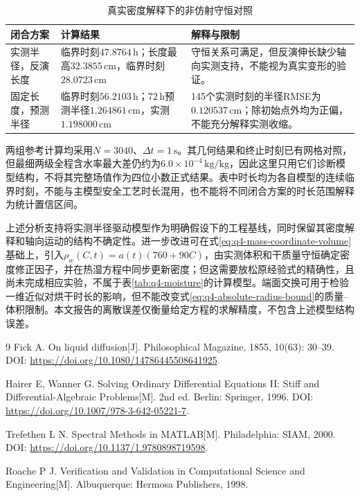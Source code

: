 \documentclass[withoutpreface,bwprint]{cumcmthesis}
\begin{document}
\begin{table}[H]
\centering
\small
\renewcommand{\arraystretch}{1.2}
\caption{真实密度解释下的非仿射守恒对照}
\label{tab:q4-closure-comparison}
\begin{tabularx}{\textwidth}{>{\raggedright\arraybackslash}p{} >{\raggedright\arraybackslash}X >{\raggedright\arraybackslash}X}
\hline
闭合方案 & 计算结果 & 解释与限制\\
\hline
实测半径，反演长度 & 临界时刻$47.8764\,\mathrm h$；长度最高$32.3855\,\mathrm{cm}$，临界时刻$28.0723\,\mathrm{cm}$ & 守恒关系可满足，但反演伸长缺少轴向实测支持，不能视为真实变形的验证。\\
固定长度，预测半径 & 临界时刻$56.2103\,\mathrm h$；$72\,\mathrm h$预测半径$1.264861\,\mathrm{cm}$，实测$1.198000\,\mathrm{cm}$ & 145个实测时刻的半径RMSE为$0.120537\,\mathrm{cm}$；除初始点外均为正偏，不能充分解释实测收缩。\\
\hline
\end{tabularx}
\end{table}

两组参考计算均采用$N=3040$、$\Delta t=1\,\mathrm s$。其几何结果和终止时刻已有网格对照，但最细两级全程含水率最大差仍约为$6.0\times10^{-4}\,\mathrm{kg/kg}$，因此这里只用它们诊断模型结构，不将其完整场值作为四位小数正式结果。表中时长均为各自模型的连续临界时刻，不能与主模型安全工艺时长混用，也不能将不同闭合方案的时长范围解释为统计置信区间。

上述分析支持将实测半径驱动模型作为明确假设下的工程基线，同时保留其密度解释和轴向运动的结构不确定性。进一步改进可在式\eqref{eq:q4-mass-coordinate-volume}基础上，引入$\rho_w(C,t)=a(t)(760+90C)$，由实测体积和干质量守恒确定密度修正因子，并在热湿方程中同步更新密度；但这需要放松原经验式的精确性，且尚未完成相应实验，不属于表\ref{tab:q4-moisture}的计算模型。端面交换可用于检验一维近似对烘干时长的影响，但不能改变式\eqref{eq:q4-absolute-radius-bound}的质量--体积限制。本文报告的离散误差仅衡量给定方程的求解精度，不包含上述模型结构误差。

\begin{thebibliography}{9}
Fick A. On liquid diffusion[J]. Philosophical Magazine, 1855, 10(63): 30--39. DOI: \url{https://doi.org/10.1080/14786445508641925}.

Hairer E, Wanner G. Solving Ordinary Differential Equations II: Stiff and Differential-Algebraic Problems[M]. 2nd ed. Berlin: Springer, 1996. DOI: \url{https://doi.org/10.1007/978-3-642-05221-7}.

Trefethen L N. Spectral Methods in MATLAB[M]. Philadelphia: SIAM, 2000. DOI: \url{https://doi.org/10.1137/1.9780898719598}.

Roache P J. Verification and Validation in Computational Science and Engineering[M]. Albuquerque: Hermosa Publishers, 1998.

\end{thebibliography}
\end{document}
